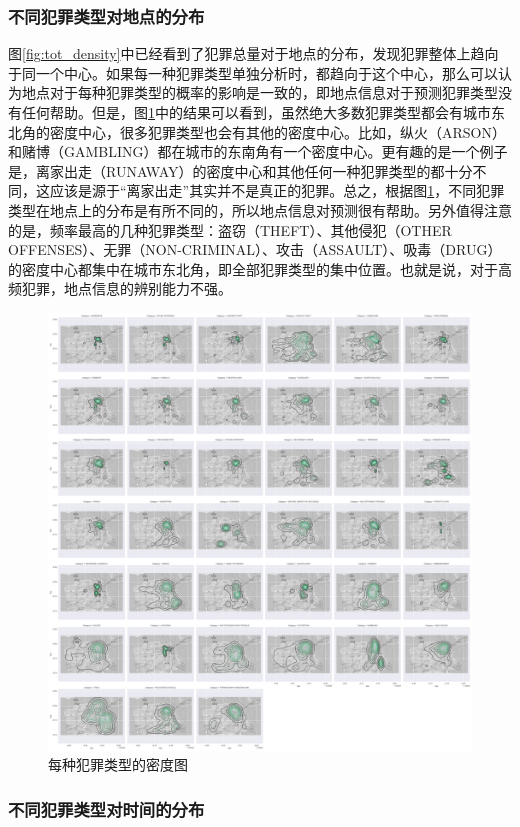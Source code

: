 \subsubsection{不同犯罪类型对地点的分布}

图\ref{fig:tot_density}中已经看到了犯罪总量对于地点的分布，发现犯罪整体上趋向于同一个中心。如果每一种犯罪类型单独分析时，都趋向于这个中心，那么可以认为地点对于每种犯罪类型的概率的影响是一致的，即地点信息对于预测犯罪类型没有任何帮助。但是，图\ref{fig:tot_category}中的结果可以看到，虽然绝大多数犯罪类型都会有城市东北角的密度中心，很多犯罪类型也会有其他的密度中心。比如，纵火（ARSON）和赌博（GAMBLING）都在城市的东南角有一个密度中心。更有趣的是一个例子是，离家出走（RUNAWAY）的密度中心和其他任何一种犯罪类型的都十分不同，这应该是源于“离家出走”其实并不是真正的犯罪。总之，根据图\ref{fig:tot_category}，不同犯罪类型在地点上的分布是有所不同的，所以地点信息对预测很有帮助。另外值得注意的是，频率最高的几种犯罪类型：盗窃（THEFT）、其他侵犯（OTHER OFFENSES）、无罪（NON-CRIMINAL）、攻击（ASSAULT）、吸毒（DRUG）的密度中心都集中在城市东北角，即全部犯罪类型的集中位置。也就是说，对于高频犯罪，地点信息的辨别能力不强。

\begin{figure}[tb]
    \centering
    \includegraphics[width=1.0\linewidth]{fig/category_density}
    \caption{每种犯罪类型的密度图}
    \label{fig:tot_category}
\end{figure}

\subsubsection{不同犯罪类型对时间的分布}




